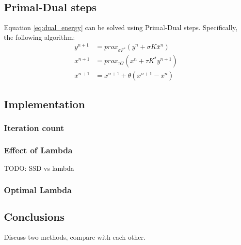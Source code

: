 \documentclass{paper}
\begin{document}
\subsection*{Primal-Dual steps}
Equation \ref{eq:dual_energy} can be solved using Primal-Dual steps. Specifically,
the following algorithm:
\begin{align}
	y^{n+1} &= prox_{\sigma F^*}(y^n + \sigma K \bar{x}^n) \\
	x^{n+1} &= prox_{\tau G}(x^n + \tau K^* y^{n+1}) \\
	\bar{x}^{n+1} &= x^{n+1} + \theta(x^{n+1} - x^n)
\end{align}
\subsection*{Implementation}

\subsubsection*{Iteration count}


\subsubsection*{Effect of Lambda}
TODO: SSD vs lambda

\subsubsection*{Optimal Lambda}

\subsection*{Conclusions}
Discuss two methods, compare with each other.
\end{document}
